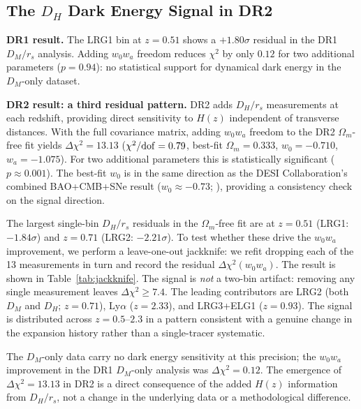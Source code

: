 \documentclass[12pt,a4paper]{article}
\begin{document}
\subsection{The $D_H$ Dark Energy Signal in DR2}
\label{sec:z051}

\textbf{DR1 result.}
The LRG1 bin at $z = 0.51$ shows a $+1.80\sigma$ residual in the DR1
$D_M/r_s$ analysis. Adding $w_0w_a$ freedom reduces $\chi^2$ by only $0.12$
for two additional parameters ($p = 0.94$): no statistical support for
dynamical dark energy in the $D_M$-only dataset.

\textbf{DR2 result: a third residual pattern.}
DR2 adds $D_H/r_s$ measurements at each redshift, providing direct sensitivity
to $H(z)$ independent of transverse distances. With the full covariance matrix,
adding $w_0w_a$ freedom to the DR2 $\Omega_m$-free fit yields $\Delta\chi^2 =
13.13$ ($\chi^2/{\rm dof} = 0.79$, best-fit $\Omega_m = 0.333$, $w_0 =
-0.710$, $w_a = -1.075$). For two additional parameters this is statistically
significant ($p \approx 0.001$). The best-fit $w_0$ is in the same direction
as the DESI Collaboration's combined BAO+CMB+SNe result ($w_0 \approx -0.73$;
\citealt{DESI_2025_DR2}), providing a consistency check on the signal direction.

The largest single-bin $D_H/r_s$ residuals in the $\Omega_m$-free fit are
at $z = 0.51$ (LRG1: $-1.84\sigma$) and $z = 0.71$ (LRG2: $-2.21\sigma$).
To test whether these drive the $w_0w_a$ improvement, we perform a
leave-one-out jackknife: we refit dropping each of the 13 measurements in turn
and record the residual $\Delta\chi^2(w_0w_a)$. The result is shown in
Table~\ref{tab:jackknife}. The signal is \emph{not} a two-bin artifact:
removing any single measurement leaves $\Delta\chi^2 \geq 7.4$. The leading
contributors are LRG2 (both $D_M$ and $D_H$; $z=0.71$), Ly$\alpha$ ($z=2.33$),
and LRG3+ELG1 ($z=0.93$). The signal is distributed across $z = 0.5$--$2.3$
in a pattern consistent with a genuine change in the expansion history rather
than a single-tracer systematic.

The $D_M$-only data carry no dark energy sensitivity at this precision; the
$w_0w_a$ improvement in the DR1 $D_M$-only analysis was $\Delta\chi^2 = 0.12$.
The emergence of $\Delta\chi^2 = 13.13$ in DR2 is a direct consequence of the
added $H(z)$ information from $D_H/r_s$, not a change in the underlying data
or a methodological difference.
\end{document}
